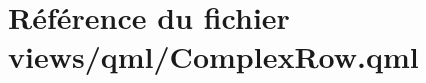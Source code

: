 \hypertarget{ComplexRow_8qml}{\section{Référence du fichier views/qml/\-Complex\-Row.qml}
\label{ComplexRow_8qml}
}
